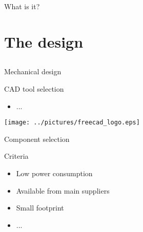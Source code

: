 \documentclass[compress,red]{beamer}
\begin{document}
\begin{frame}{What is it?}


\end{frame}


\section{The design}

\subsection*{} %

\begin{frame}{Mechanical design}

  \begin{block}{CAD tool selection}
    \begin{itemize}
    \item ...
    \end{itemize}
  \end{block}

  \begin{center}
    \texttt{[image: ../pictures/freecad\_logo.eps]}
  \end{center}

\end{frame}

\begin{frame}{Component selection}

  \begin{block}{Criteria}
    \begin{itemize}
    \item Low power consumption
    \item Available from main suppliers
    \item Small footprint
    \item ...
    \end{itemize}
  \end{block}

  \note[item]{}

\end{frame}
\end{document}
